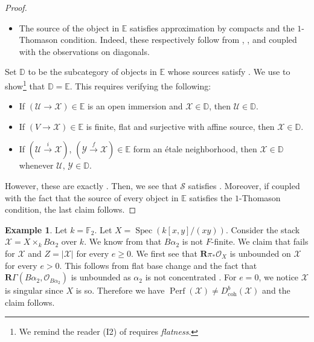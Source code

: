 \documentclass[11pt]{amsart}
\theoremstyle{plain}
\theoremstyle{definition}
\newtheorem{example}[theorem]{Example}
\numberwithin{equation}{section}
\numberwithin{theorem}{section}
\begin{document}
\begin{proof}
\begin{itemize}
        \item The source of the object in $\mathbb{E}$ satisfies approximation by compacts and the $1$-Thomason condition. 
        Indeed, these respectively follow from \cite[Lemma 4.6(i)]{Hall/Rydh:2019}, \cite[Theorem A]{Hall/Lamarche/Lank/Peng:2025}, and \cite[Theorem A]{Hall/Rydh:2017} coupled with the observations on diagonals.
    \end{itemize}
    Set $\mathbb{D}$ to be the subcategory of objects in $\mathbb{E}$ whose sources satisfy . 
    We use \cite[Theorem E]{Hall/Rydh:2018} to show\footnote{We remind the reader (I2) of \cite[Theorem E]{Hall/Rydh:2018} requires \textit{flatness}.} that $\mathbb{D}=\mathbb{E}$. 
    This requires verifying the following:
    \begin{itemize}
        \item If $(\mathcal{U} \to \mathcal{X})\in\mathbb{E}$ is an open immersion and $\mathcal{X}\in\mathbb{D}$, then $\mathcal{U}\in\mathbb{D}$.
        \item If $(V \to \mathcal{X})\in \mathbb{E}$ is finite, flat and surjective with affine source, then $\mathcal{X}\in\mathbb{D}$.
        \item If $(\mathcal{U} \xrightarrow{i} \mathcal{X})$, $(\mathcal{Y} \xrightarrow{f} \mathcal{X})\in\mathbb{E}$ form an \'{e}tale neighborhood, then $\mathcal{X}\in \mathbb{D}$ whenever $\mathcal{U}$, $\mathcal{Y}\in\mathbb{D}$.
    \end{itemize}
    However, these are exactly . 
    Then, we see that $\mathcal{S}$ satisfies . 
    Moreover, if coupled with the fact that the source of every object in $\mathbb{E}$ satisfies the $1$-Thomason condition, the last claim follows.
\end{proof}

\begin{example}
    \label{ex:non_F-finite_false}
    Let $k=\mathbb{F}_2$.
    Let $X=\operatorname{Spec}(k[x,y]/(xy))$. 
    Consider the stack $\mathcal{X}=X\times_k B\alpha_2$ over $k$. 
    We know from  that $B\alpha_2$ is not $F$-finite. 
    We claim that  fails for $\mathcal{X}$ and $Z=|\mathcal{X}|$ for every $e\geq 0$. 
    We first see that $\mathbf{R}\pi_\ast\mathcal{O}_X$ is unbounded on $\mathcal{X}$ for every $e>0$. 
    This follows from flat base change and the fact that $\mathbf{R}\Gamma(B\alpha_2, \mathcal{O}_{B\alpha_2})$ is unbounded as $\alpha_2$ is not concentrated \cite[Remark 4.6]{Hall/Rydh:2017}. 
    For $e=0$, we notice $\mathcal{X}$ is singular since $X$ is so. Therefore we have $\operatorname{Perf}(\mathcal{X})\neq D_{\operatorname{coh}}^b(\mathcal{X})$ and the claim follows.
\end{example}
\end{document}
